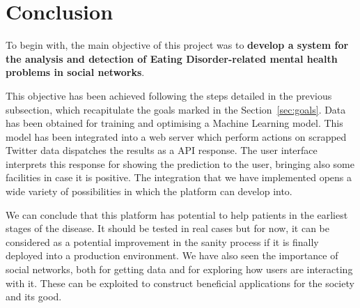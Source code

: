 \section{Conclusion}
\label{sec:conclusion}

To begin with, the main objective of this project was to \textbf{develop a system for the analysis and detection of Eating Disorder-related mental health problems in social networks}.

This objective has been achieved following the steps detailed in the previous subsection, which recapitulate the goals marked in the Section~\ref{sec:goals}. Data has been obtained for training and optimising a Machine Learning model. This model has been integrated into a web server which perform actions on scrapped Twitter data dispatches the results as a API response. The user interface interprets this response for showing the prediction to the user, bringing also some facilities in case it is positive. The integration that we have implemented opens a wide variety of possibilities in which the platform can develop into. 

We can conclude that this platform has potential to help patients in the earliest stages of the disease. It should be tested in real cases but for now, it can be considered as a potential improvement in the sanity process if it is finally deployed into a production environment. We have also seen the importance of social networks, both for getting data and for exploring how users are interacting with it. These can be exploited to construct beneficial applications for the society and its good.



